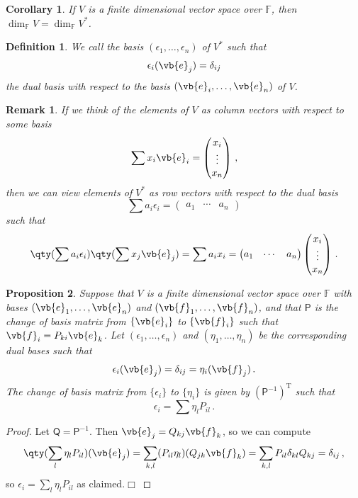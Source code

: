 \documentclass{article}
\theoremstyle{plain}\theoremheaderfont{\normalfont\itshape}\theorembodyfont{\rmfamily}\theoremseparator{.}\newtheorem*{rem}{Remark}\newtheorem*{ex}{Example}\newtheorem*{proof}{Proof}\newtheorem*{altp}{Alternative proof}
\theoremstyle{plain}\theoremheaderfont{\normalfont\bfseries}\theorembodyfont{\rmfamily}\theoremseparator{.}\newtheorem{thm}{Theorem}[section]\newtheorem{lem}[thm]{Lemma}\newtheorem{prop}[thm]{Proposition}\newtheorem*{cor}{Corollary}\newtheorem{defn}[thm]{Definition}\newtheorem{clm}[thm]{Claim}\newtheorem{clminproof}{Claim}
\theoremstyle{break}\theoremheaderfont{\normalfont\itshape}\theorembodyfont{\rmfamily}\theoremseparator{.\medskip}\newtheorem*{proofskip}{Proof}\newtheorem*{exs}{Examples}\newtheorem*{rems}{Remarks}
\theoremstyle{break}\theoremheaderfont{\normalfont\bfseries}\theorembodyfont{\rmfamily}\theoremseparator{.\medskip}\newtheorem{lemskip}[thm]{Lemma}\newtheorem{defnskip}[thm]{Definition}\newtheorem{propskip}[thm]{Proposition}\newtheorem{thmskip}[thm]{Theorem}
\numberwithin{equation}{section}
\newcommand{\qed}{\hfill\ensuremath{\Box}}
\newcommand{\tp}{^\mathrm{T}}
\begin{document}
	\begin{cor}
		If \(V\) is a finite dimensional vector space over \(\mathbb{F}\), then \(\dim_\mathbb{F} V=\dim_\mathbb{F} V^*\).
	\end{cor}
	\begin{defn}
		We call the basis \((\epsilon_1,\dots,\epsilon_n)\) of \(V^*\) such that
		\[\epsilon_i(\vb{e}_j)=\delta_{ij}\]
		the \textit{dual basis} with respect to the basis \((\vb{e}_i,\dots,\vb{e}_n)\) of \(V\).
	\end{defn}
	\begin{rem}
		If we think of the elements of \(V\) as column vectors with respect to some basis
		\[\sum x_i\vb{e}_i=\begin{pmatrix}
			x_i \\ \vdots \\ x_n
		\end{pmatrix}\,,\]
		then we can view elements of \(V^*\) as row vectors with respect to the dual basis
		\[\sum a_i\epsilon_i=\begin{pmatrix}
			a_1 & \cdots & a_n
		\end{pmatrix}\]
		such that
		\[\qty(\sum a_i\epsilon_i)\qty(\sum x_j\vb{e}_j)=\sum a_ix_i=\begin{pmatrix}
			a_1 & \cdots & a_n
		\end{pmatrix}\begin{pmatrix}
			x_i \\ \vdots \\ x_n
		\end{pmatrix}\,.\]
	\end{rem}
	\begin{prop}
		Suppose that \(V\) is a finite dimensional vector space over \(\mathbb{F}\) with bases \((\vb{e}_1,\dots,\vb{e}_n)\) and \((\vb{f}_1,\dots,\vb{f}_n)\), and that \(\mathsf{P}\) is the change of basis matrix from \(\{\vb{e}_i\}\) to \(\{\vb{f}_i\}\) such that \(\vb{f}_i=P_{ki}\vb{e}_k\). Let \((\epsilon_1,\dots,\epsilon_n)\) and \((\eta_1,\dots,\eta_n)\) be the corresponding dual bases such that
		\[\epsilon_i(\vb{e}_j)=\delta_{ij}=\eta_i(\vb{f}_j)\,.\]
		The change of basis matrix from \(\{\epsilon_i\}\) to \(\{\eta_i\}\) is given by \((\mathsf{P}^{-1})\tp\) such that
		\[\epsilon_i=\sum\eta_lP_{il}\,.\]
	\end{prop}
	\begin{proof}
		Let \(\mathsf{Q}=\mathsf{P}^{-1}\). Then \(\vb{e}_j=Q_{kj}\vb{f}_k\), so we can compute
		\begin{align*}
			\qty(\sum_l \eta_lP_{il})(\vb{e}_j)=\sum_{k,l}(P_{il}\eta_l)(Q_{jk}\vb{f}_k)=\sum_{k,l}P_{il}\delta_{kl}Q_{kj}=\delta_{ij}\,,
		\end{align*}
		so \(\epsilon_i=\sum_l\eta_lP_{il}\) as claimed.\qed
	\end{proof}
\end{document}
